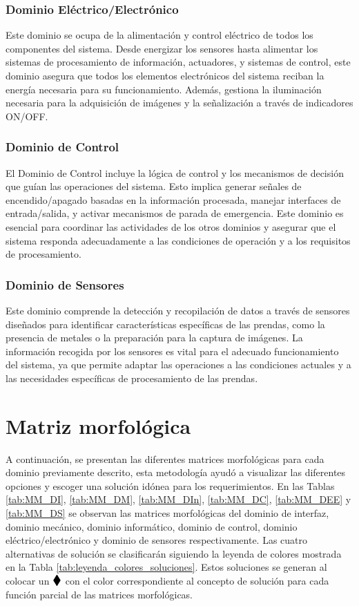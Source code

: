 \subsubsection{Dominio Eléctrico/Electrónico}

Este dominio se ocupa de la alimentación y control eléctrico de todos los componentes del sistema. Desde energizar los sensores hasta alimentar los sistemas de procesamiento de información, actuadores, y sistemas de control, este dominio asegura que todos los elementos electrónicos del sistema reciban la energía necesaria para su funcionamiento. Además, gestiona la iluminación necesaria para la adquisición de imágenes y la señalización a través de indicadores ON/OFF.

\subsubsection{Dominio de Control}

El Dominio de Control incluye la lógica de control y los mecanismos de decisión que guían las operaciones del sistema. Esto implica generar señales de encendido/apagado basadas en la información procesada, manejar interfaces de entrada/salida, y activar mecanismos de parada de emergencia. Este dominio es esencial para coordinar las actividades de los otros dominios y asegurar que el sistema responda adecuadamente a las condiciones de operación y a los requisitos de procesamiento.

\subsubsection{Dominio de Sensores}

Este dominio comprende la detección y recopilación de datos a través de sensores diseñados para identificar características específicas de las prendas, como la presencia de metales o la preparación para la captura de imágenes. La información recogida por los sensores es vital para el adecuado funcionamiento del sistema, ya que permite adaptar las operaciones a las condiciones actuales y a las necesidades específicas de procesamiento de las prendas.

\section{Matriz morfológica}

A continuación, se presentan las diferentes matrices morfológicas para cada dominio previamente descrito, esta metodología ayudó a visualizar las diferentes opciones y escoger una solución idónea para los requerimientos. En las Tablas \ref{tab:MM_DI}, \ref{tab:MM_DM}, \ref{tab:MM_DIn}, \ref{tab:MM_DC}, \ref{tab:MM_DEE} y \ref{tab:MM_DS} se observan las matrices morfológicas del dominio de interfaz, dominio mecánico, dominio informático, dominio de control, dominio eléctrico/electrónico y dominio de sensores respectivamente. 
Las cuatro alternativas de solución se clasificarán siguiendo la leyenda de colores mostrada en la Tabla \ref{tab:leyenda_colores_soluciones}. Estos soluciones se generan al colocar un $\B{\blacklozenge}{1.35}$ con el color correspondiente al concepto de solución para cada función parcial de las matrices morfológicas.

